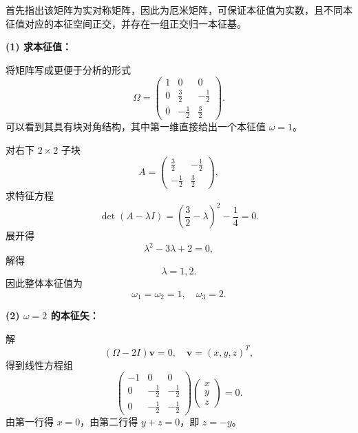 \begin{solution}[考虑厄米矩阵的本征值与本征空间结构]
\answer
首先指出该矩阵为实对称矩阵，因此为厄米矩阵，可保证本征值为实数，且不同本征值对应的本征空间正交，并存在一组正交归一本征基。

\vspace{0.3em}
\textbf{(1) 求本征值：}

将矩阵写成更便于分析的形式
\[
\Omega=
\begin{pmatrix}
1&0&0\\
0&\frac{3}{2}&-\frac{1}{2}\\
0&-\frac{1}{2}&\frac{3}{2}
\end{pmatrix}.
\]
可以看到其具有块对角结构，其中第一维直接给出一个本征值 $\omega=1$。

对右下 $2\times2$ 子块
\[
A=\begin{pmatrix}
\frac{3}{2}&-\frac{1}{2}\\
-\frac{1}{2}&\frac{3}{2}
\end{pmatrix},
\]
求特征方程
\[
\det(A-\lambda I)=\left(\frac{3}{2}-\lambda\right)^2-\frac{1}{4}=0.
\]
展开得
\[
\lambda^2-3\lambda+2=0,
\]
解得
\[
\lambda=1,2.
\]
因此整体本征值为
\[
\omega_1=\omega_2=1,\quad \omega_3=2.
\]

\vspace{0.5em}
\textbf{(2) $\omega=2$ 的本征矢：}

解
\[
(\Omega-2I)\mathbf{v}=0,
\quad
\mathbf{v}=(x,y,z)^T,
\]
得到线性方程组
\[
\begin{pmatrix}
-1&0&0\\
0&-\frac{1}{2}&-\frac{1}{2}\\
0&-\frac{1}{2}&-\frac{1}{2}
\end{pmatrix}
\begin{pmatrix}x\\y\\z\end{pmatrix}=0.
\]
由第一行得 $x=0$，由第二行得 $y+z=0$，即 $z=-y$。


\end{solution}

